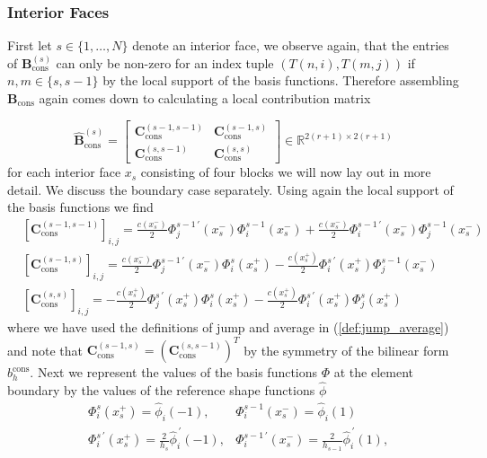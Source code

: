\subsubsection{Interior Faces}
First let $s \in \{1,\ldots,N\}$ denote an interior face, we observe again, that the entries of 
$\textbf{B}_{\text{cons}}^{(s)}$ can only be non-zero for an index tuple $(T(n,i),T(m,j))$ if 
$n,m \in \{s, s-1\}$ by the local support of the basis functions.
Therefore assembling $ \textbf{B}_{\text{cons}}$ again comes down to calculating a local contribution matrix 

\begin{equation*}
    \widehat{\textbf{B}}_{\text{cons}}^{(s)} = 
    \begin{bmatrix}
        \textbf{C}_{\text{cons}}^{(s-1,s-1)} & \textbf{C}_{\text{cons}}^{(s-1,s)} \\
        \textbf{C}_{\text{cons}}^{(s,s-1)} & \textbf{C}_{\text{cons}}^{(s,s)} 
    \end{bmatrix}
    \in \mathbb{R}^{2(r+1) \times 2(r+1)}
\end{equation*}
for each interior face $x_s$ consisting of four blocks we will now lay out in more detail.
We discuss the boundary case separately.
Using again the local support of the basis functions we find
\begin{align*}
    &[\textbf{C}_{\text{cons}}^{(s-1,s-1)}]_{i,j} = \frac{c(x_s^-)}{2} \Phi_j^{s-1\, \prime}(x_s^-) \Phi_i^{s-1}(x_s^-) + \frac{c(x_s^-)}{2} \Phi_i^{s-1\, \prime}(x_s^-) \Phi_j^{s-1}(x_s^-) \\
    &[\textbf{C}_{\text{cons}}^{(s-1,s)}]_{i,j} = \frac{c(x_s^-)}{2} \Phi_j^{s-1\, \prime}(x_s^-) \Phi_i^{s}(x_s^+) - \frac{c(x_s^+)}{2} \Phi_i^{s\, \prime}(x_s^+) \Phi_j^{s-1}(x_s^-) \\
    &[\textbf{C}_{\text{cons}}^{(s,s)}]_{i,j} = -\frac{c(x_s^+)}{2} \Phi_j^{s\, \prime}(x_s^+) \Phi_i^{s}(x_s^+) - \frac{c(x_s^+)}{2} \Phi_i^{s\, \prime}(x_s^+) \Phi_j^{s}(x_s^+)
\end{align*}
where we have used the definitions of jump and average in (\ref{def:jump_average})
and note that $ \textbf{C}_{\text{cons}}^{(s-1,s)} = (\textbf{C}_{\text{cons}}^{(s,s-1)})^T$ by the symmetry of the bilinear form $b_h^{\text{cons}}$.
Next we represent the values of the basis functions $ \Phi $ at the element boundary by the values of the reference 
shape functions $\widehat{\phi}$
\begin{align*}
    & \Phi_i^s(x_s^+) = \widehat{\phi}_i(-1) , & \Phi^{s-1}_i(x_s^-) = \widehat{\phi}_i(1) \\
    & \Phi_i^{s\, \prime }(x_s^+) = \frac{2}{h_{s}} \widehat{\phi}_i^{\,\prime}(-1), 
    & \Phi_i^{s-1\, \prime }(x_s^-) = \frac{2}{h_{s-1}} \widehat{\phi}_i^{\,\prime}(1), 
\end{align*}
